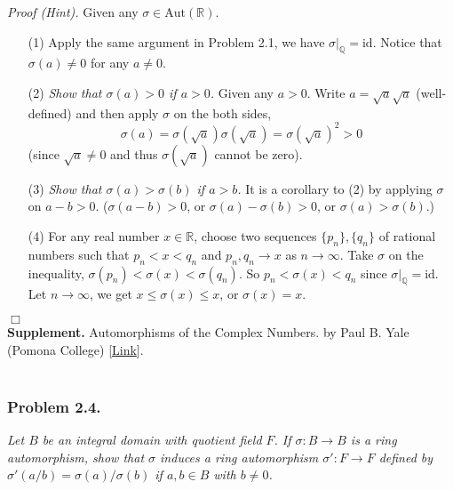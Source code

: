\documentclass{article}
\begin{document}
\emph{Proof (Hint).}
Given any $\sigma \in \text{Aut}(\mathbb{R})$.
\begin{enumerate}
\item[(1)]
Apply the same argument in Problem 2.1, we have $\sigma|_{\mathbb{Q}} = \text{id}$.
Notice that $\sigma(a) \neq 0$ for any $a \neq 0$.
\item[(2)]
\emph{Show that $\sigma(a) > 0$ if $a > 0$.}
Given any $a > 0$.
Write $a = \sqrt{a}\sqrt{a}$ (well-defined) and then apply
$\sigma$ on the both sides,
$$\sigma(a) = \sigma(\sqrt{a})\sigma(\sqrt{a}) = \sigma(\sqrt{a})^2 > 0$$
(since $\sqrt{a} \neq 0$ and thus $\sigma(\sqrt{a})$ cannot be zero).
\item[(3)]
\emph{Show that $\sigma(a) > \sigma(b)$ if $a > b$.}
It is a corollary to (2) by applying $\sigma$ on $a - b > 0$.
($\sigma(a - b) > 0$, or $\sigma(a) - \sigma(b) > 0$, or $\sigma(a) > \sigma(b)$.)
\item[(4)]
For any real number $x \in \mathbb{R}$,
choose two sequences $\{p_n\}, \{q_n\}$ of rational numbers
such that $p_n < x < q_n$ and $p_n, q_n \to x$ as $n \to \infty$.
Take $\sigma$ on the inequality, $\sigma(p_n) < \sigma(x) < \sigma(q_n)$.
So $p_n < \sigma(x) < q_n$ since $\sigma|_{\mathbb{Q}} = \text{id}$.
Let $n \to \infty$, we get $x \leq \sigma(x) \leq x$, or $\sigma(x) = x$.
\end{enumerate}
$\Box$ \\

\textbf{Supplement.}
Automorphisms of the Complex Numbers. by Paul B. Yale (Pomona College)
[\href{https://www.maa.org/sites/default/files/pdf/upload_library/22/Ford/PaulBYale.pdf}
{Link}]. \\\\






\subsubsection*{Problem 2.4.}
\emph{Let $B$ be an integral domain with quotient field $F$.
If $\sigma: B \to B$ is a ring automorphism, show that $\sigma$ induces
a ring automorphism $\sigma': F \to F$ defined by
$\sigma'(a/b) = \sigma(a)/\sigma(b)$ if $a, b \in B$ with $b \neq 0$.} \\
\end{document}
